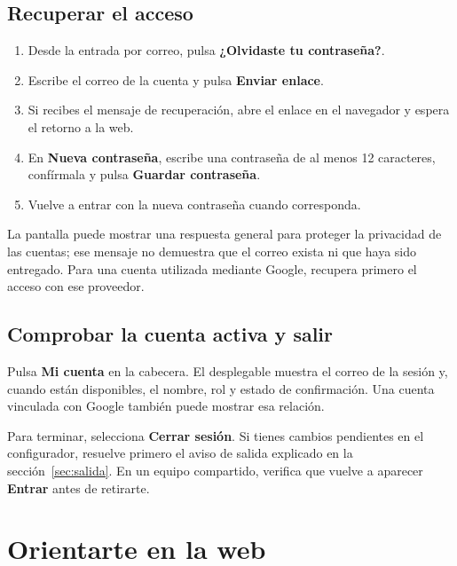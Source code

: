 \documentclass[12pt,letterpaper]{article}
\newcommand{\control}[1]{\textbf{#1}}
\begin{document}
\subsection{Recuperar el acceso}
\begin{enumerate}
\item Desde la entrada por correo, pulsa \control{¿Olvidaste tu contraseña?}.
\item Escribe el correo de la cuenta y pulsa \control{Enviar enlace}.
\item Si recibes el mensaje de recuperación, abre el enlace en el navegador y espera el retorno a la web.
\item En \control{Nueva contraseña}, escribe una contraseña de al menos 12 caracteres, confírmala y pulsa \control{Guardar contraseña}.
\item Vuelve a entrar con la nueva contraseña cuando corresponda.
\end{enumerate}
La pantalla puede mostrar una respuesta general para proteger la privacidad de las cuentas; ese mensaje no demuestra que el correo exista ni que haya sido entregado. Para una cuenta utilizada mediante Google, recupera primero el acceso con ese proveedor.

\subsection{Comprobar la cuenta activa y salir}
Pulsa \control{Mi cuenta} en la cabecera. El desplegable muestra el correo de la sesión y, cuando están disponibles, el nombre, rol y estado de confirmación. Una cuenta vinculada con Google también puede mostrar esa relación.

Para terminar, selecciona \control{Cerrar sesión}. Si tienes cambios pendientes en el configurador, resuelve primero el aviso de salida explicado en la sección~\ref{sec:salida}. En un equipo compartido, verifica que vuelve a aparecer \control{Entrar} antes de retirarte.
\clearpage
\section{Orientarte en la web}
\end{document}
